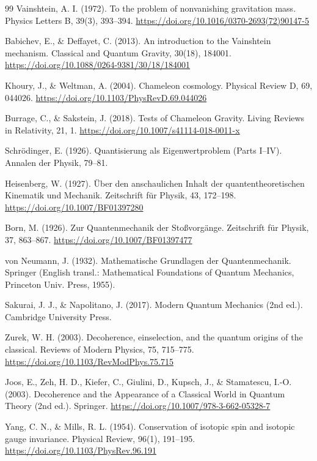 \documentclass[12pt,a4paper]{article}
\begin{document}
\begin{thebibliography}{99}
		Vainshtein, A. I. (1972). To the problem of nonvanishing gravitation mass. Physics Letters B, 39(3), 393–394. \url{https://doi.org/10.1016/0370-2693(72)90147-5}
		
		Babichev, E., \& Deffayet, C. (2013). An introduction to the Vainshtein mechanism. Classical and Quantum Gravity, 30(18), 184001. \url{https://doi.org/10.1088/0264-9381/30/18/184001}
		
		Khoury, J., \& Weltman, A. (2004). Chameleon cosmology. Physical Review D, 69, 044026. \url{https://doi.org/10.1103/PhysRevD.69.044026}
		
		Burrage, C., \& Sakstein, J. (2018). Tests of Chameleon Gravity. Living Reviews in Relativity, 21, 1. \url{https://doi.org/10.1007/s41114-018-0011-x}
		
		Schrödinger, E. (1926). Quantisierung als Eigenwertproblem (Parts I–IV). Annalen der Physik, 79–81.
		
		Heisenberg, W. (1927). Über den anschaulichen Inhalt der quantentheoretischen Kinematik und Mechanik. Zeitschrift für Physik, 43, 172–198. \url{https://doi.org/10.1007/BF01397280}
		
		Born, M. (1926). Zur Quantenmechanik der Stoßvorgänge. Zeitschrift für Physik, 37, 863–867. \url{https://doi.org/10.1007/BF01397477}
		
		von Neumann, J. (1932). Mathematische Grundlagen der Quantenmechanik. Springer (English transl.: Mathematical Foundations of Quantum Mechanics, Princeton Univ. Press, 1955).
		
		Sakurai, J. J., \& Napolitano, J. (2017). Modern Quantum Mechanics (2nd ed.). Cambridge University Press.
		
		Zurek, W. H. (2003). Decoherence, einselection, and the quantum origins of the classical. Reviews of Modern Physics, 75, 715–775. \url{https://doi.org/10.1103/RevModPhys.75.715}
		
		Joos, E., Zeh, H. D., Kiefer, C., Giulini, D., Kupsch, J., \& Stamatescu, I.-O. (2003). Decoherence and the Appearance of a Classical World in Quantum Theory (2nd ed.). Springer. \url{https://doi.org/10.1007/978-3-662-05328-7}
		
		Yang, C. N., \& Mills, R. L. (1954). Conservation of isotopic spin and isotopic gauge invariance. Physical Review, 96(1), 191–195. \url{https://doi.org/10.1103/PhysRev.96.191}
		

\end{thebibliography}
\end{document}
